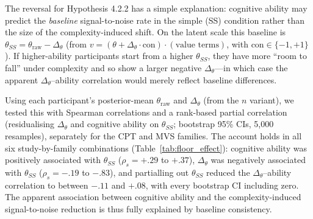 \documentclass[man,floatsintext]{apa7}
\begin{document}
The reversal for Hypothesis 4.2.2 has a simple explanation: cognitive ability may predict the \emph{baseline} signal-to-noise rate in the simple (SS) condition rather than the size of the complexity-induced shift. On the latent scale this baseline is $\theta_{SS} = \theta_{\text{raw}} - \Delta_\theta$ (from $v = (\theta + \Delta_\theta \cdot \text{con}) \cdot (\text{value terms})$, with $\text{con} \in \{-1, +1\}$). If higher-ability participants start from a higher $\theta_{SS}$, they have more ``room to fall'' under complexity and so show a larger negative $\Delta_\theta$---in which case the apparent $\Delta_\theta$--ability correlation would merely reflect baseline differences.

Using each participant's posterior-mean $\theta_{\text{raw}}$ and $\Delta_\theta$ (from the $n$ variant), we tested this with Spearman correlations and a rank-based partial correlation (residualising $\Delta_\theta$ and cognitive ability on $\theta_{SS}$; bootstrap 95\% CIs, 5{,}000 resamples), separately for the CPT and MVS families. The account holds in all six study-by-family combinations (Table~\ref{tab:floor_effect}): cognitive ability was positively associated with $\theta_{SS}$ ($\rho_s = +.29$ to $+.37$), $\Delta_\theta$ was negatively associated with $\theta_{SS}$ ($\rho_s = -.19$ to $-.83$), and partialling out $\theta_{SS}$ reduced the $\Delta_\theta$--ability correlation to between $-.11$ and $+.08$, with every bootstrap CI including zero. The apparent association between cognitive ability and the complexity-induced signal-to-noise reduction is thus fully explained by baseline consistency.
\end{document}
